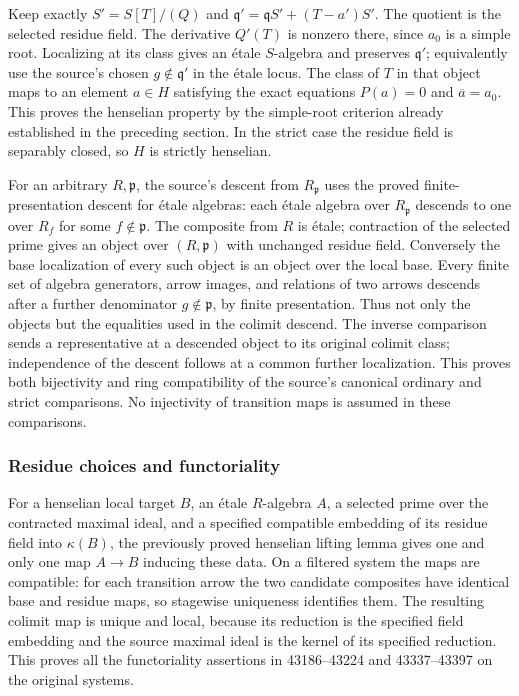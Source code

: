 Keep exactly \(S'=S[T]/(Q)\) and \(\mathfrak q'=\mathfrak qS'+(T-a')S'\). The quotient is the selected residue field. The derivative \(Q'(T)\) is nonzero there, since \(a_0\) is a simple root. Localizing at its class gives an étale \(S\)-algebra and preserves \(\mathfrak q'\); equivalently use the source's chosen \(g\notin\mathfrak q'\) in the étale locus. The class of \(T\) in that object maps to an element \(a\in H\) satisfying the exact equations \(P(a)=0\) and \(\overline a=a_0\). This proves the henselian property by the simple-root criterion already established in the preceding section. In the strict case the residue field is separably closed, so \(H\) is strictly henselian.

For an arbitrary \(R,\mathfrak p\), the source's descent from \(R_{\mathfrak p}\) uses the proved finite-presentation descent for étale algebras: each étale algebra over \(R_{\mathfrak p}\) descends to one over \(R_f\) for some \(f\notin\mathfrak p\). The composite from \(R\) is étale; contraction of the selected prime gives an object over \((R,\mathfrak p)\) with unchanged residue field. Conversely the base localization of every such object is an object over the local base. Every finite set of algebra generators, arrow images, and relations of two arrows descends after a further denominator \(g\notin\mathfrak p\), by finite presentation. Thus not only the objects but the equalities used in the colimit descend. The inverse comparison sends a representative at a descended object to its original colimit class; independence of the descent follows at a common further localization. This proves both bijectivity and ring compatibility of the source's canonical ordinary and strict comparisons. No injectivity of transition maps is assumed in these comparisons.

\subsubsection{Residue choices and functoriality}\label{algebra-proof-060-residue-choices-and-functoriality}

For a henselian local target \(B\), an étale \(R\)-algebra \(A\), a selected prime over the contracted maximal ideal, and a specified compatible embedding of its residue field into \(\kappa(B)\), the previously proved henselian lifting lemma gives one and only one map \(A\to B\) inducing these data. On a filtered system the maps are compatible: for each transition arrow the two candidate composites have identical base and residue maps, so stagewise uniqueness identifies them. The resulting colimit map is unique and local, because its reduction is the specified field embedding and the source maximal ideal is the kernel of its specified reduction. This proves all the functoriality assertions in 43186--43224 and 43337--43397 on the original systems.

